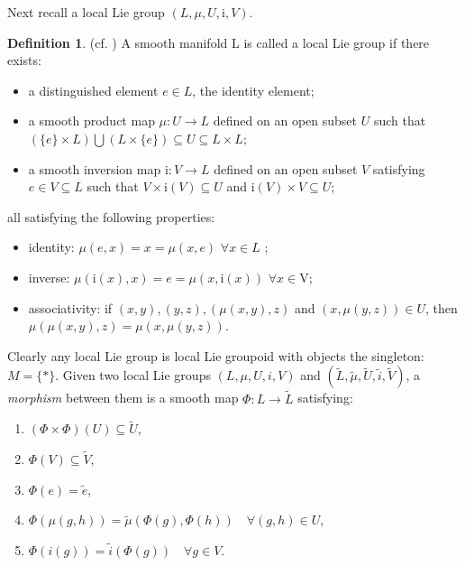 \documentclass[12pt,a4paper]{amsart}
\theoremstyle{plain}
\theoremstyle{definition}
\newtheorem{definition}[theorem]{Definition}
\begin{document}
Next recall a local Lie group $(L,\mu,U, \mathrm{i}, V)$.
\begin{definition} (cf. \cite{Neeb})
    A smooth manifold L is called a local Lie group if there exists:
    \begin{itemize}
        \item a distinguished element $e \in L$, the identity element;
        \item a smooth product map $\mu: U \rightarrow L$ defined on an open subset $U$  such that $(\{e\}\times L)\bigcup (L \times \{e\})\subseteq U \subseteq L \times L;$
        \item a smooth inversion map $\mathrm{i}:V \rightarrow L$ defined on an open subset $V$ satisfying $e \in V\subseteq L$ such that $V\times \mathrm{i}(V) \subseteq U$ and $\mathrm{i}(V)\times V\subseteq U$;
    \end{itemize}
    all satisfying the following properties:
    \begin{itemize}
        \item identity: $\mu(e,x)=x=\mu(x,e) \,\, \forall x \in L$ ;
        \item inverse: $\mu(\mathrm{i}(x),x)=e=\mu(x,\mathrm{i}(x)) \,\,\forall x \in \mathrm{V}$;
        \item associativity: if $(x,y), (y,z), (\mu(x,y),z)$   and  $(x, \mu(y,z))\in U$, then $\mu(\mu(x,y),z)=\mu(x, \mu(y,z))$. 
    \end{itemize}
\end{definition}
Clearly any local Lie group is local Lie groupoid with objects the singleton: $M=\{*\}$.
     Given two local Lie groups 
$(L,\mu, U, i, V)$ and $(\tilde{L},\tilde{\mu}, \tilde{U}, \tilde{i},\tilde{V})$, 
a \textit{morphism} between them is a smooth map 
$\Phi: L \to \tilde{L}$ satisfying:
\begin{enumerate}
    \item $(\Phi \times \Phi)(U)\subseteq \tilde{U}$,
    
    \item $\Phi(V)\subseteq \tilde{V}$,
    
    \item $\Phi(e)=\tilde{e}$,
    
    \item  $  \Phi(\mu(g,h))
    =
    \tilde{\mu}(\Phi(g),\Phi(h))
    \quad \forall (g,h)\in U$,
    
    \item 
    
    $\Phi(i(g))
    =
    \tilde{i}(\Phi(g))
    \quad \forall g\in V$.
    
\end{enumerate}
\end{document}
